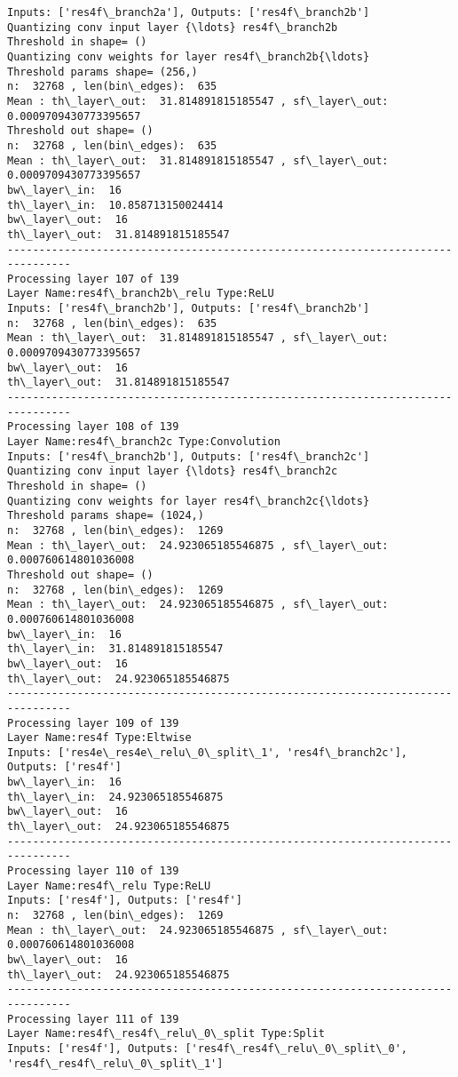 \documentclass[11pt]{article}
\begin{document}
\begin{Verbatim}[commandchars=\\\{\}]
Inputs: ['res4f\_branch2a'], Outputs: ['res4f\_branch2b']
Quantizing conv input layer {\ldots} res4f\_branch2b
Threshold in shape= ()
Quantizing conv weights for layer res4f\_branch2b{\ldots}
Threshold params shape= (256,)
n:  32768 , len(bin\_edges):  635
Mean : th\_layer\_out:  31.814891815185547 , sf\_layer\_out:  0.0009709430773395657
Threshold out shape= ()
n:  32768 , len(bin\_edges):  635
Mean : th\_layer\_out:  31.814891815185547 , sf\_layer\_out:  0.0009709430773395657
bw\_layer\_in:  16
th\_layer\_in:  10.858713150024414
bw\_layer\_out:  16
th\_layer\_out:  31.814891815185547
--------------------------------------------------------------------------------
Processing layer 107 of 139
Layer Name:res4f\_branch2b\_relu Type:ReLU
Inputs: ['res4f\_branch2b'], Outputs: ['res4f\_branch2b']
n:  32768 , len(bin\_edges):  635
Mean : th\_layer\_out:  31.814891815185547 , sf\_layer\_out:  0.0009709430773395657
bw\_layer\_out:  16
th\_layer\_out:  31.814891815185547
--------------------------------------------------------------------------------
Processing layer 108 of 139
Layer Name:res4f\_branch2c Type:Convolution
Inputs: ['res4f\_branch2b'], Outputs: ['res4f\_branch2c']
Quantizing conv input layer {\ldots} res4f\_branch2c
Threshold in shape= ()
Quantizing conv weights for layer res4f\_branch2c{\ldots}
Threshold params shape= (1024,)
n:  32768 , len(bin\_edges):  1269
Mean : th\_layer\_out:  24.923065185546875 , sf\_layer\_out:  0.000760614801036008
Threshold out shape= ()
n:  32768 , len(bin\_edges):  1269
Mean : th\_layer\_out:  24.923065185546875 , sf\_layer\_out:  0.000760614801036008
bw\_layer\_in:  16
th\_layer\_in:  31.814891815185547
bw\_layer\_out:  16
th\_layer\_out:  24.923065185546875
--------------------------------------------------------------------------------
Processing layer 109 of 139
Layer Name:res4f Type:Eltwise
Inputs: ['res4e\_res4e\_relu\_0\_split\_1', 'res4f\_branch2c'], Outputs: ['res4f']
bw\_layer\_in:  16
th\_layer\_in:  24.923065185546875
bw\_layer\_out:  16
th\_layer\_out:  24.923065185546875
--------------------------------------------------------------------------------
Processing layer 110 of 139
Layer Name:res4f\_relu Type:ReLU
Inputs: ['res4f'], Outputs: ['res4f']
n:  32768 , len(bin\_edges):  1269
Mean : th\_layer\_out:  24.923065185546875 , sf\_layer\_out:  0.000760614801036008
bw\_layer\_out:  16
th\_layer\_out:  24.923065185546875
--------------------------------------------------------------------------------
Processing layer 111 of 139
Layer Name:res4f\_res4f\_relu\_0\_split Type:Split
Inputs: ['res4f'], Outputs: ['res4f\_res4f\_relu\_0\_split\_0', 'res4f\_res4f\_relu\_0\_split\_1']

\end{Verbatim}
\end{document}
